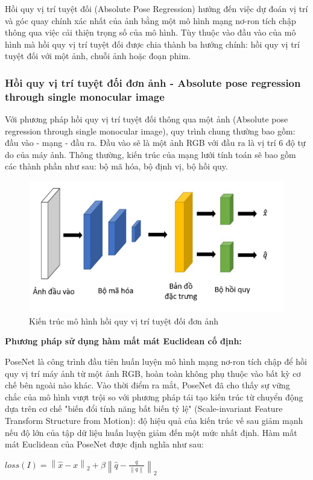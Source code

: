 Hồi quy vị trí tuyệt đối (Absolute Pose Regression) hướng đến việc dự đoán vị trí và góc quay chính xác nhất của ảnh bằng một mô hình mạng nơ-ron tích chập thông qua việc cải thiện trọng số của mô hình. Tùy thuộc vào đầu vào của mô hình mà hồi quy vị trí tuyệt đối được chia thành ba hướng chính: hồi quy vị trí tuyệt đối với một ảnh, chuỗi ảnh hoặc đoạn phim.

\subsubsection*{Hồi quy vị trí tuyệt đối đơn ảnh - Absolute pose regression through single monocular image}
Với phương pháp hồi quy vị trí tuyệt đối thông qua một ảnh (Absolute pose regression through single monocular image), quy trình chung thường bao gồm: đầu vào - mạng - đầu ra. Đầu vào sẽ là một ảnh RGB với đầu ra là vị trí 6 độ tự do của máy ảnh. Thông thường, kiến trúc của mạng lưới tính toán sẽ bao gồm các thành phần như sau: bộ mã hóa, bộ định vị, bộ hồi quy.

\begin{figure}[H]
    \centering
    \includegraphics[scale=0.7]{pics/Chapter2/kientruc_APR_1.png}
    \caption{Kiến trúc mô hình hồi quy vị trí tuyệt đối đơn ảnh \cite{kendall2016posenet}}
\end{figure}

\noindent\textbf{Phương pháp sử dụng hàm mất mát Euclidean cố định:}

PoseNet \cite{kendall2016posenet} là công trình đầu tiên huấn luyện mô hình mạng nơ-ron tích chập để hồi quy vị trí máy ảnh từ một ảnh RGB, hoàn toàn không phụ thuộc vào bất kỳ cơ chế bên ngoài nào khác. Vào thời điểm ra mắt, PoseNet đã cho thấy sự vững chắc của mô hình vượt trội so với phương pháp tái tạo kiến trúc từ chuyển động dựa trên cơ chế "biến đổi tính năng bất biến tỷ lệ" (Scale-invariant Feature Transform Structure from Motion): độ hiệu quả của kiến trúc vế sau giảm mạnh nếu độ lớn của tập dữ liệu huấn luyện giảm đến một mức nhất định. Hàm mất mát Euclidean của PoseNet được định nghĩa như sau:
\begin{center}
    $loss(I) = \left \| \hat{x} - x \right \|_2 + \beta \left \| \hat{q} - \frac{q}{\left \| q \right \|} \right \|_2$
\end{center}

